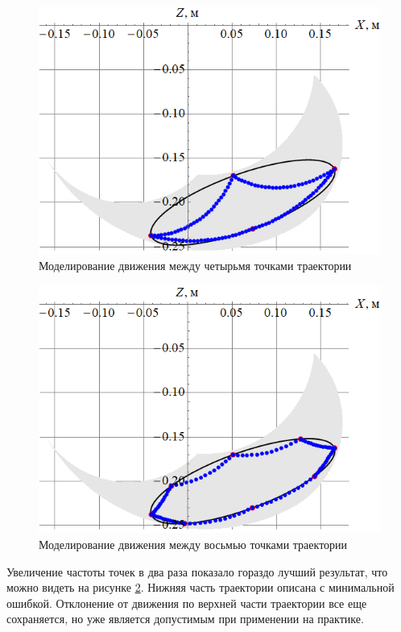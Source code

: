 \begin{figure}[h]
    \centering
    \includegraphics[scale=0.6]{chapter_walking_model/figure6.png}
    \caption{Моделирование движения между четырьмя точками траектории}
    \label{fig:traj2}
\end{figure}

\begin{figure}[h!]
    \centering
    \includegraphics[scale=0.6]{chapter_walking_model/figure7.png}
    \caption{Моделирование движения между восьмью точками траектории}
    \label{fig:traj3}
\end{figure}

Увеличение частоты точек в два раза показало гораздо лучший результат, что можно видеть на рисунке \ref{fig:traj3}. Нижняя часть траектории описана с минимальной ошибкой. Отклонение от движения по верхней части траектории все еще сохраняется, но уже является допустимым при применении на практике.

